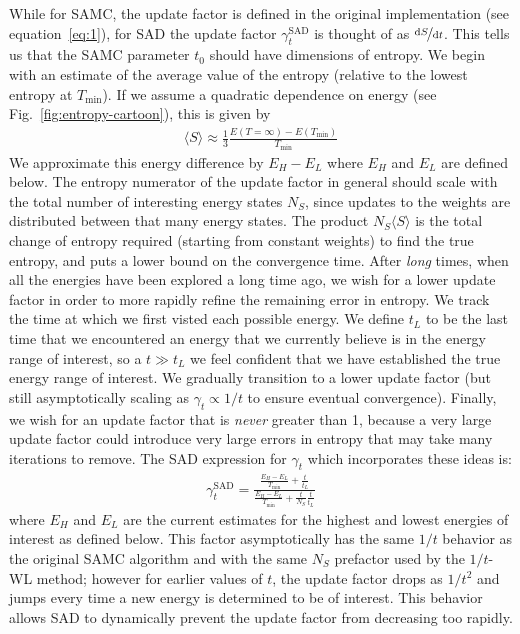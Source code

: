 \documentclass[letterpaper,twocolumn,amsmath,amssymb,pre,aps,10pt]{revtex4-1}
\begin{document}
While for SAMC, the update factor is defined in the original
implementation (see equation~\eqref{eq:1}), for SAD the update factor $\gamma_{t}^{\text{SAD}}$ is
thought of as $\nicefrac{\text{d}S}{\text{d}t}$. This tells us that
the SAMC parameter
$t_0$ should have dimensions of entropy.
We begin with an estimate of the average value of the entropy (relative
to the lowest entropy at $T_{\min}$).  If we assume a quadratic
dependence on energy (see Fig.~\ref{fig:entropy-cartoon}), this is given by
\begin{align}
\langle S\rangle \approx \frac13 \frac{E({T=\infty}) - E(T_{\min})}{T_{\min}}
\end{align}
We approximate this energy difference by $E_H -E_L$ where $E_H$ and
$E_L$ are defined below. The entropy numerator of the update factor in
general should scale with the total number of interesting energy states
$N_S$, since updates to the weights are distributed between that many
energy states.  The product $N_S\langle S\rangle$ is the total change
of entropy required (starting from constant weights) to find the true
entropy, and puts a lower bound on the convergence time. After
\emph{long} times, when all the energies have been explored a long time ago, we
wish for a lower update factor in order to more rapidly refine the
remaining error in entropy.  We track the time at which we first visted
each possible energy.  We define $t_L$ to be the last time that we
encountered an energy that we currently believe is in the energy range
of interest, so a $t\gg t_L$ we feel confident that we have established
the true energy range of interest. We gradually transition to a lower
update factor (but still asymptotically scaling as $\gamma_t \propto
1/t$ to ensure eventual convergence).  Finally, we wish for an update
factor that is \emph{never} greater than 1, because a very large update
factor could introduce very large errors in entropy that may take many iterations
to remove.  The SAD expression for $\gamma_t$ which incorporates these
ideas is:
\begin{align}
  \gamma_{t}^{\text{SAD}} =
     \frac{
       \frac{E_{H}-E_{L}}{T_{\text{min}}} + \frac{t}{t_L}
     }{
       \frac{E_{H}-E_{L}}{T_{\text{min}}} + \frac{t}{N_S}\frac{t}{t_L}
     }
\end{align}
where $E_H$ and $E_L$ are the current estimates for the highest and
lowest energies of interest as defined below.  This factor
asymptotically has the same $1/t$ behavior as the original SAMC
algorithm and with the same $N_S$ prefactor used by the $1/t$-WL
method; however for earlier values of $t$, the update factor drops as
$1/t^2$ and jumps every time a new energy is determined to be of
interest.  This behavior allows SAD to dynamically prevent the update
factor from decreasing too rapidly.
\end{document}

